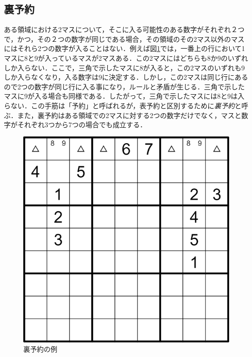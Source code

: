 \documentclass[submit,techrep,noauthor]{ipsj}
\begin{document}
	\subsection{裏予約}
ある領域における2マスについて，そこに入る可能性のある数字がそれぞれ２つで，かつ，その２つの数字が同じである場合，その領域のその2マス以外のマスにはそれら2つの数字が入ることはない．例えば図\ref{yoyaku_sample_reverse}では，一番上の行において1マスに8と9が入っているマスが2マスある．この2マスにはどちらも8か9のいずれしか入らない．ここで，三角で示したマスに8が入ると，この2マスのいずれも9しか入らなくなり，入る数字は9に決定する．しかし，この2マスは同じ行にあるので2つの数字が同じ行に入る事になり，ルールと矛盾が生じる．三角で示したマスに9が入る場合も同様である．したがって，三角で示したマスには8と9は入らない．この手筋は「予約」と呼ばれるが，表予約と区別するために\emph{裏予約}と呼ぶ\cite{数独通信43}．また，裏予約はある領域での2マスに対する2つの数字だけでなく，マスと数字がそれぞれ3つから7つの場合でも成立する．


	\begin{figure}[hbtp]
	\setlength\textfloatsep{0pt}
 	\centering
 	\includegraphics[keepaspectratio, scale=0.2]
      		{sample_yoyaku_reverse.png}
 	\caption{裏予約の例}
 	\label{yoyaku_sample_reverse}
	\end{figure}
\end{document}

